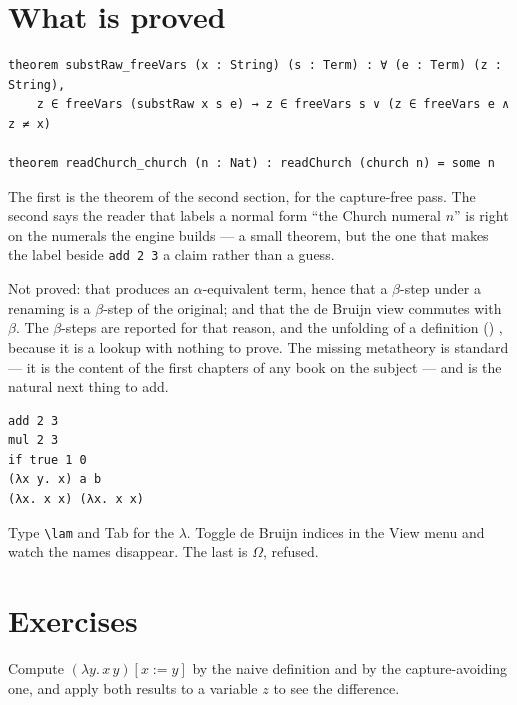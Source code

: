 \section{What is proved}

\begin{verbatim}
theorem substRaw_freeVars (x : String) (s : Term) : ∀ (e : Term) (z : String),
    z ∈ freeVars (substRaw x s e) → z ∈ freeVars s ∨ (z ∈ freeVars e ∧ z ≠ x)

theorem readChurch_church (n : Nat) : readChurch (church n) = some n
\end{verbatim}

The first is the theorem of the second section, for the capture-free pass. The second says the
reader that labels a normal form ``the Church numeral $n$'' is right on the numerals the engine
builds --- a small theorem, but the one that makes the label beside \texttt{add 2 3} a claim
rather than a guess.

Not proved: that  produces an $\alpha$-equivalent term, hence that a $\beta$-step
under a renaming is a $\beta$-step of the original; and that the de Bruijn view commutes with
$\beta$. The $\beta$-steps are reported  for that reason, and the unfolding of
a definition () , because it is a lookup with nothing to prove.
The missing metatheory is standard --- it is the content of the first chapters of any book on
the subject --- and is the natural next thing to add.

\begin{trybox}
\begin{verbatim}
add 2 3
mul 2 3
if true 1 0
(λx y. x) a b
(λx. x x) (λx. x x)
\end{verbatim}
  Type \texttt{\textbackslash lam} and Tab for the $\lambda$. Toggle de Bruijn indices in the
  View menu and watch the names disappear. The last is $\Omega$, refused.
\end{trybox}

\section{Exercises}

\begin{exercisebox}[Capture]
  Compute $(\lambda y.\, x\, y)[x := y]$ by the naive definition and by the capture-avoiding
  one, and apply both results to a variable $z$ to see the difference.
\end{exercisebox}

